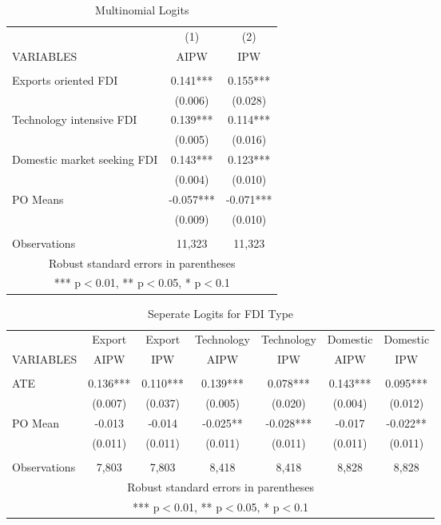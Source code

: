 \documentclass[a4paper,11pt]{scrartcl}
\begin{document}
\begin{table}[htbp]\centering
\caption{Multinomial Logits}
\begin{tabular}{lcc} \hline
 & (1) & (2)  \\
VARIABLES & AIPW & IPW \\ \hline
 &    &  \\
Exports oriented FDI &  0.141*** &   0.155***  \\
 & (0.006) &   (0.028)   \\
Technology intensive FDI &0.139*** &   0.114***   \\
 & (0.005) &   (0.016)   \\
Domestic market seeking FDI  &0.143***   & 0.123*** \\
 & (0.004)   & (0.010)  \\
PO Means & -0.057*** &   -0.071***    \\
 &  (0.009) &   (0.010) \\
 &  &      \\
 Observations & 11,323  & 11,323  \\ \hline
\multicolumn{3}{c}{ Robust standard errors in parentheses} \\
\multicolumn{3}{c}{ *** p$<$0.01, ** p$<$0.05, * p$<$0.1} \\
\end{tabular}
\end{table}

\begin{table}[htbp]\centering
\caption{Seperate Logits for FDI Type}
\begin{tabular}{lcccccc} \hline
 & Export   &Export  & Technology  &Technology  & Domestic  & Domestic  \\
VARIABLES & AIPW & IPW & AIPW & IPW & AIPW & IPW  \\ \hline
 &  &  &  &  &  &  \\
ATE  &0.136*** &   0.110*** &   0.139*** &   0.078*** &   0.143***   & 0.095***   \\
 & (0.007) &  (0.037)   & (0.005)   & (0.020) & (0.004) & (0.012)  \\
PO Mean &   -0.013 &   -0.014 &   -0.025** &   -0.028***   & -0.017 &   -0.022** \\
 &   (0.011) &   (0.011) &  (0.011)   & (0.011)   & (0.011)  & (0.011) \\
 &  &  &  &  &  & \\
 Observations & 7,803  & 7,803&  8,418 & 8,418  &  8,828  & 8,828 \\ \hline
\multicolumn{7}{c}{ Robust standard errors in parentheses} \\
\multicolumn{7}{c}{ *** p$<$0.01, ** p$<$0.05, * p$<$0.1} \\
\end{tabular}
\end{table}
\end{document}
